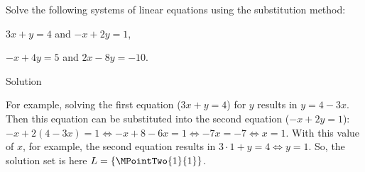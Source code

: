 \begin{MExercises}
\begin{MExercise}
Solve the following systems of linear equations using the substitution method:
\begin{MExerciseItems}
\item{$3 x + y = 4$ and $- x + 2 y = 1$,}
\item{$- x + 4 y = 5$ and $2 x - 8 y = - 10$.}
\end{MExerciseItems}

\begin{MHint}{Solution}
\begin{MExerciseItems}
\item{For example, solving the first equation ($3 x + y = 4$) for $y$ results in
$y = 4 - 3 x$. Then this equation can be substituted into the second equation ($- x + 2 y = 1$):
$- x + 2 (4 - 3 x) = 1 \Leftrightarrow - x + 8 - 6 x = 1 \Leftrightarrow - 7 x = - 7
\Leftrightarrow x = 1$. With this value of $x$, for example, the second equation results in
$3 \cdot 1 + y = 4 \Leftrightarrow y = 1$. So, the solution set is here 
${\ML} = \{ \MPointTwo{1}{1} \}$.

}
\end{MExerciseItems}
\end{MHint}
\end{MExercise}
\end{MExercises}
